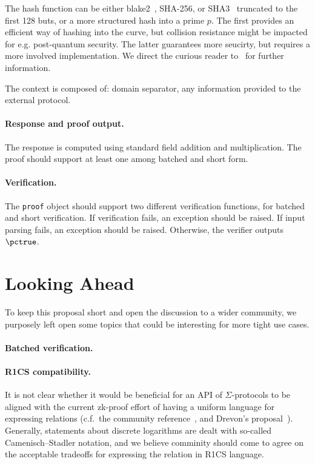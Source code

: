 \documentclass[runningheads]{llncs}
\begin{document}
The hash function can be either blake2~\cite{XX}, SHA-256, or SHA3~\cite{XX} truncated to the first 128 buts, or a more structured hash into a prime $p$.
The first provides an efficient way of hashing into the curve, but collision resistance might be impacted for e.g. post-quantum security.
The latter guarantees more seucirty, but requires a more involved implementation.
We direct the curious reader to~\cite{XX} for further information.

The context is composed of: domain separator, any information provided to the external protocol.

\paragraph{Response and proof output.} The response is computed using standard field addition and multiplication. The proof should support at least one among batched and short form.
\paragraph{Verification.} The \verb|proof| object should support two different verification functions, for batched and short verification.
If verification fails, an exception should be raised.
If input parsing fails, an exception should be raised.
Otherwise, the verifier outputs $\pctrue$.





\section{Looking Ahead}
To keep this proposal short and open the discussion to a wider community, we purposely left open some topics that could
be interesting for more tight use cases.
\paragraph{Batched verification.}
\paragraph{R1CS compatibility.} It is not clear whether it would be beneficial for an API of $\Sigma$-protocols to be aligned with the current zk-proof effort of having a uniform
language for expressing relations (c.f.\ the community reference~\cite[section 3]{zkproof-reference}, and Drevon's proposal~\cite{jr1cs}).
Generally, statements about discrete logarithms are dealt with so-called Camenisch--Stadler notation, and we believe comminity should come to agree on the acceptable tradeoffs for expressing the relation in R1CS language.



%
\end{document}
